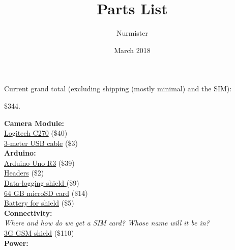 \documentclass{article}
\title{Parts List}
\author{Nurmister}
\date{March 2018}
\begin{document}
\maketitle

Current grand total (excluding shipping (mostly minimal) and the SIM): 
\begin{center} \$344.
\\ \end{center}

\hspace*{-5mm}\textbf{Camera Module:}
\\
\hspace*{10mm}\href{https://www.qoo10.sg/gmkt.inc/goods/goods.aspx?goodscode=419765716\&jaehuid=2026058764}{Logitech
 C270} (\$40)
\\
\hspace*{10mm}\href{https://goo.gl/GuZxJm}{3-meter USB cable} (\$3)
\\
\textbf{Arduino:}
\\
\hspace*{10mm}\href{https://www.sgbotic.com/index.php?dispatch=products.view\&product_id=1842}{Arduino
 Uno R3} (\$39)
\\
\hspace*{10mm}\href{https://www.sgbotic.com/index.php?dispatch=products.view\&product\_id=1176}{Headers}
 (\$2) \\
\hspace*{10mm}\href{https://goo.gl/yQebem}{Data-logging shield } (\$9)
\\
\hspace*{20mm}\href{https://www.lazada.sg/products/64gb128gb256gb512gb-class-10-micro-memory-sd-card-with-adaptor-red-intl-i142237635-s174867244.html}{64
 GB microSD card} (\$14) \\
\hspace*{20mm}\href{https://www.lazada.sg/products/sony-lithium-cell-cr1220-3v-button-battery-2-pieces-i149268393-s184886719.html?spm=a2o42.searchlist.list.10.15b56b8eUZ6PbG&search=1}{Battery
 for shield} (\$5)
\\
\textbf{Connectivity:}
\\
\hspace*{10mm}\textit{Where and how do we get a SIM card? Whose name will it be in?}
\\
\hspace*{10mm}\href{https://www.sgbotic.com/index.php?dispatch=products.view\&product_id=2294}{3G 
GSM shield} (\$110)
\\
\textbf{Power:}
\\
\end{document}
